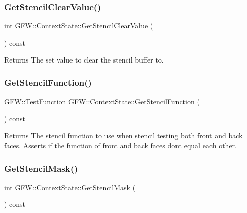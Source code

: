 \subsubsection{\texorpdfstring{Get\+Stencil\+Clear\+Value()}{GetStencilClearValue()}}
{\footnotesize\ttfamily int G\+F\+W\+::\+Context\+State\+::\+Get\+Stencil\+Clear\+Value (\begin{DoxyParamCaption}{ }\end{DoxyParamCaption}) const}

\begin{DoxyReturn}{Returns}
The set value to clear the stencil buffer to. 
\end{DoxyReturn}
\mbox{\label{class_g_f_w_1_1_context_state_a7ddf3257ec54d4fb039e8873ae493836}} 
\subsubsection{\texorpdfstring{Get\+Stencil\+Function()}{GetStencilFunction()}}
{\footnotesize\ttfamily \hyperlink{namespace_g_f_w_a2eabb5a646179bceaab2d5e3bfce2316}{G\+F\+W\+::\+Test\+Function} G\+F\+W\+::\+Context\+State\+::\+Get\+Stencil\+Function (\begin{DoxyParamCaption}{ }\end{DoxyParamCaption}) const}

\begin{DoxyReturn}{Returns}
The stencil function to use when stencil testing both front and back faces. Asserts if the function of front and back faces don\textquotesingle{}t equal each other. 
\end{DoxyReturn}
\mbox{\label{class_g_f_w_1_1_context_state_ad4a8a7a19848145d39bec3de746de41c}} 
\subsubsection{\texorpdfstring{Get\+Stencil\+Mask()}{GetStencilMask()}}
{\footnotesize\ttfamily int G\+F\+W\+::\+Context\+State\+::\+Get\+Stencil\+Mask (\begin{DoxyParamCaption}{ }\end{DoxyParamCaption}) const}

